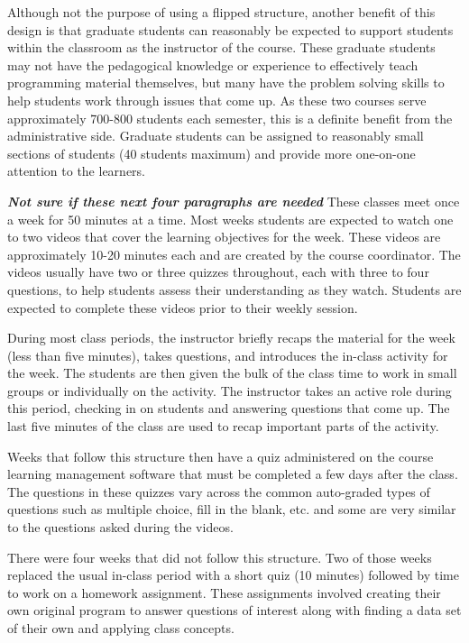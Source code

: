 \documentclass[
  letterpaper,
  DIV=11,
  numbers=noendperiod]{scrartcl}
\begin{document}
Although not the purpose of using a flipped structure, another benefit
of this design is that graduate students can reasonably be expected to
support students within the classroom as the instructor of the course.
These graduate students may not have the pedagogical knowledge or
experience to effectively teach programming material themselves, but
many have the problem solving skills to help students work through
issues that come up. As these two courses serve approximately 700-800
students each semester, this is a definite benefit from the
administrative side. Graduate students can be assigned to reasonably
small sections of students (40 students maximum) and provide more
one-on-one attention to the learners.

\textbf{\emph{Not sure if these next four paragraphs are needed}} These
classes meet once a week for 50 minutes at a time. Most weeks students
are expected to watch one to two videos that cover the learning
objectives for the week. These videos are approximately 10-20 minutes
each and are created by the course coordinator. The videos usually have
two or three quizzes throughout, each with three to four questions, to
help students assess their understanding as they watch. Students are
expected to complete these videos prior to their weekly session.

During most class periods, the instructor briefly recaps the material
for the week (less than five minutes), takes questions, and introduces
the in-class activity for the week. The students are then given the bulk
of the class time to work in small groups or individually on the
activity. The instructor takes an active role during this period,
checking in on students and answering questions that come up. The last
five minutes of the class are used to recap important parts of the
activity.

Weeks that follow this structure then have a quiz administered on the
course learning management software that must be completed a few days
after the class. The questions in these quizzes vary across the common
auto-graded types of questions such as multiple choice, fill in the
blank, etc. and some are very similar to the questions asked during the
videos.

There were four weeks that did not follow this structure. Two of those
weeks replaced the usual in-class period with a short quiz (10 minutes)
followed by time to work on a homework assignment. These assignments
involved creating their own original program to answer questions of
interest along with finding a data set of their own and applying class
concepts.
\end{document}
